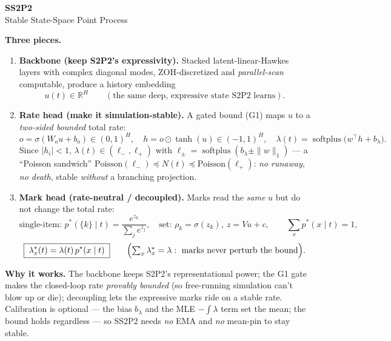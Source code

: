 \documentclass[12pt]{article}
\newcommand{\R}{\mathbb{R}}
\newcommand{\softplus}{\operatorname{softplus}}
\begin{document}
\begin{center}
{\LARGE\textbf{SS2P2}}\\[2pt]
{\large Stable State-Space Point Process}
\end{center}

\vspace{1em}

\begin{center}
\end{center}

\vspace{1.5em}

\noindent\textbf{Three pieces.}
\begin{enumerate}[leftmargin=1.6em,itemsep=6pt]

\item \textbf{Backbone (keep S2P2's expressivity).} Stacked latent-linear-Hawkes
layers with complex diagonal modes, ZOH-discretized and \emph{parallel-scan}
computable, produce a history embedding
\[
u(t)\in\R^{H}\qquad(\text{the same deep, expressive state S2P2 learns}).
\]

\item \textbf{Rate head (make it simulation-stable).} A gated bound (G1) maps
$u$ to a \emph{two-sided bounded} total rate:
\[
o=\sigma(W_o u+b_o)\in(0,1)^H,\quad
h=o\odot\tanh(u)\in(-1,1)^H,\quad
\lambda(t)=\softplus\!\bigl(w^\top h+b_\lambda\bigr).
\]
Since $|h_i|<1$,\; $\lambda(t)\in(\ell_-,\ell_+)$ with
$\ell_\pm=\softplus(b_\lambda\pm\|w\|_1)$ — a ``Poisson sandwich''
$\mathrm{Poisson}(\ell_-)\preceq N(t)\preceq\mathrm{Poisson}(\ell_+)$: \emph{no
runaway, no death}, stable \emph{without} a branching projection.

\item \textbf{Mark head (rate-neutral / decoupled).} Marks read the \emph{same}
$u$ but do not change the total rate:
\[
\text{single-item: } p^*(\{k\}\mid t)=\frac{e^{z_k}}{\sum_j e^{z_j}},\quad
\text{set: } \rho_k=\sigma(z_k),\ z=Vu+c,
\qquad \sum_x p^*(x\mid t)=1,
\]
\[
\boxed{\;\lambda^*_x(t)=\lambda(t)\,p^*(x\mid t)\;}\qquad
\Bigl(\textstyle\sum_x\lambda^*_x=\lambda:\ \text{marks never perturb the bound}\Bigr).
\]
\end{enumerate}

\vspace{0.8em}

\noindent\textbf{Why it works.} The backbone keeps S2P2's representational power;
the G1 gate makes the closed-loop rate \emph{provably bounded} (so free-running
simulation can't blow up or die); decoupling lets the expressive marks ride on a
stable rate. Calibration is optional — the bias $b_\lambda$ and the MLE
$-\int\lambda$ term set the mean; the bound holds regardless — so SS2P2 needs
\emph{no} EMA and \emph{no} mean-pin to stay stable.
\end{document}
